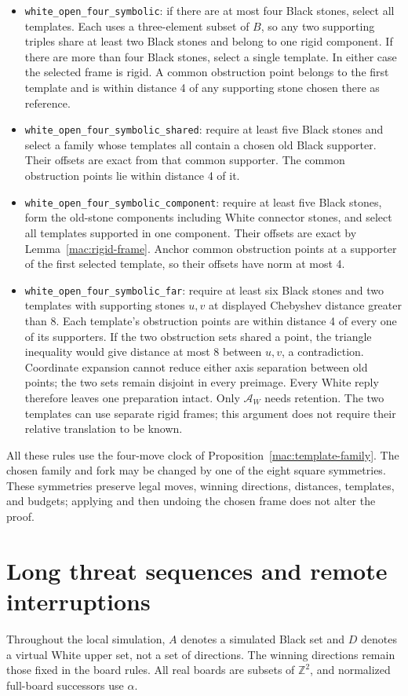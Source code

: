 \documentclass[11pt]{article}
\theoremstyle{definition}
\theoremstyle{remark}
\newcommand{\Z}{\mathbb Z}
\newcommand{\A}{\alpha}
\begin{document}
\begin{itemize}
\item \texttt{white\_open\_four\_symbolic}: if there are at most four Black stones, select all templates. Each uses a three-element subset of \(B\), so any two supporting triples share at least two Black stones and belong to one rigid component. If there are more than four Black stones, select a single template. In either case the selected frame is rigid. A common obstruction point belongs to the first template and is within distance 4 of any supporting stone chosen there as reference.
\item \texttt{white\_open\_four\_symbolic\_shared}: require at least five Black stones and select a family whose templates all contain a chosen old Black supporter. Their offsets are exact from that common supporter. The common obstruction points lie within distance 4 of it.
\item \texttt{white\_open\_four\_symbolic\_component}: require at least five Black stones, form the old-stone components including White connector stones, and select all templates supported in one component. Their offsets are exact by Lemma~\ref{mac:rigid-frame}. Anchor common obstruction points at a supporter of the first selected template, so their offsets have norm at most 4.
\item \texttt{white\_open\_four\_symbolic\_far}: require at least six Black stones and two templates with supporting stones \(u,v\) at displayed Chebyshev distance greater than 8. Each template's obstruction points are within distance 4 of every one of its supporters. If the two obstruction sets shared a point, the triangle inequality would give distance at most 8 between \(u,v\), a contradiction. Coordinate expansion cannot reduce either axis separation between old points; the two sets remain disjoint in every preimage. Every White reply therefore leaves one preparation intact. Only \(\mathcal A_W\) needs retention. The two templates can use separate rigid frames; this argument does not require their relative translation to be known.

\end{itemize}
All these rules use the four-move clock of Proposition~\ref{mac:template-family}. The chosen family and fork may be changed by one of the eight square symmetries. These symmetries preserve legal moves, winning directions, distances, templates, and budgets; applying and then undoing the chosen frame does not alter the proof.

\section{Long threat sequences and remote interruptions}\label{sec:long}
Throughout the local simulation, $A$ denotes a simulated Black set and $D$ denotes a virtual White upper set, not a set of directions. The winning directions remain those fixed in the board rules. All real boards are subsets of $\Z^2$, and normalized full-board successors use $\A$.
\end{document}

